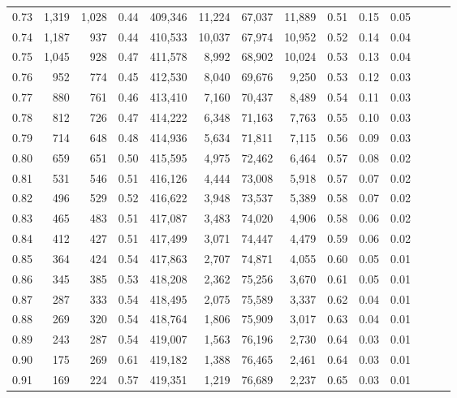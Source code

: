 \begin{tabular}{rrrrrrrrrrrrrr}
0.73 &  1,319 &  1,028 &  0.44 &  409,346 &   11,224 &  67,037 &  11,889 &  0.51 &  0.15 &      0.05 \\
0.74 &  1,187 &    937 &  0.44 &  410,533 &   10,037 &  67,974 &  10,952 &  0.52 &  0.14 &      0.04 \\
0.75 &  1,045 &    928 &  0.47 &  411,578 &    8,992 &  68,902 &  10,024 &  0.53 &  0.13 &      0.04 \\
0.76 &    952 &    774 &  0.45 &  412,530 &    8,040 &  69,676 &   9,250 &  0.53 &  0.12 &      0.03 \\
0.77 &    880 &    761 &  0.46 &  413,410 &    7,160 &  70,437 &   8,489 &  0.54 &  0.11 &      0.03 \\
0.78 &    812 &    726 &  0.47 &  414,222 &    6,348 &  71,163 &   7,763 &  0.55 &  0.10 &      0.03 \\
0.79 &    714 &    648 &  0.48 &  414,936 &    5,634 &  71,811 &   7,115 &  0.56 &  0.09 &      0.03 \\
0.80 &    659 &    651 &  0.50 &  415,595 &    4,975 &  72,462 &   6,464 &  0.57 &  0.08 &      0.02 \\
0.81 &    531 &    546 &  0.51 &  416,126 &    4,444 &  73,008 &   5,918 &  0.57 &  0.07 &      0.02 \\
0.82 &    496 &    529 &  0.52 &  416,622 &    3,948 &  73,537 &   5,389 &  0.58 &  0.07 &      0.02 \\
0.83 &    465 &    483 &  0.51 &  417,087 &    3,483 &  74,020 &   4,906 &  0.58 &  0.06 &      0.02 \\
0.84 &    412 &    427 &  0.51 &  417,499 &    3,071 &  74,447 &   4,479 &  0.59 &  0.06 &      0.02 \\
0.85 &    364 &    424 &  0.54 &  417,863 &    2,707 &  74,871 &   4,055 &  0.60 &  0.05 &      0.01 \\
0.86 &    345 &    385 &  0.53 &  418,208 &    2,362 &  75,256 &   3,670 &  0.61 &  0.05 &      0.01 \\
0.87 &    287 &    333 &  0.54 &  418,495 &    2,075 &  75,589 &   3,337 &  0.62 &  0.04 &      0.01 \\
0.88 &    269 &    320 &  0.54 &  418,764 &    1,806 &  75,909 &   3,017 &  0.63 &  0.04 &      0.01 \\
0.89 &    243 &    287 &  0.54 &  419,007 &    1,563 &  76,196 &   2,730 &  0.64 &  0.03 &      0.01 \\
0.90 &    175 &    269 &  0.61 &  419,182 &    1,388 &  76,465 &   2,461 &  0.64 &  0.03 &      0.01 \\
0.91 &    169 &    224 &  0.57 &  419,351 &    1,219 &  76,689 &   2,237 &  0.65 &  0.03 &      0.01 \\

\end{tabular}
